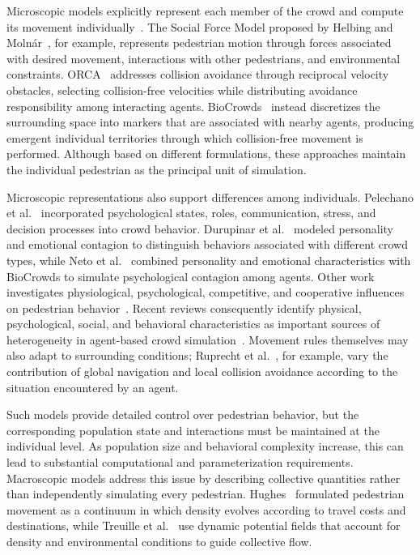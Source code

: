 Microscopic models explicitly represent each member of the crowd and compute its movement individually~\cite{macal2010agentBasedTutorial,thalmann2007crowd}. The Social Force Model proposed by Helbing and Moln\'ar~\cite{helbing1995social}, for example, represents pedestrian motion through forces associated with desired movement, interactions with other pedestrians, and environmental constraints. ORCA~\cite{van2011reciprocal} addresses collision avoidance through reciprocal velocity obstacles, selecting collision-free velocities while distributing avoidance responsibility among interacting agents. BioCrowds~\cite{de2012simulating} instead discretizes the surrounding space into markers that are associated with nearby agents, producing emergent individual territories through which collision-free movement is performed. Although based on different formulations, these approaches maintain the individual pedestrian as the principal unit of simulation.

Microscopic representations also support differences among individuals. Pelechano et al.~\cite{pelechano2005crowd} incorporated psychological states, roles, communication, stress, and decision processes into crowd behavior. Durupinar et al.~\cite{durupinar2015psychological} modeled personality and emotional contagion to distinguish behaviors associated with different crowd types, while Neto et al.~\cite{neto2017giving} combined personality and emotional characteristics with BioCrowds to simulate psychological contagion among agents. Other work investigates physiological, psychological, competitive, and cooperative influences on pedestrian behavior~\cite{narang2015generating,cao2021competitiveCooperative}. Recent reviews consequently identify physical, psychological, social, and behavioral characteristics as important sources of heterogeneity in agent-based crowd simulation~\cite{khan2024heterogeneousSurvey,zhang2023collectiveBehavior}. Movement rules themselves may also adapt to surrounding conditions; Ruprecht et al.~\cite{ruprecht2024adaptiveMovement}, for example, vary the contribution of global navigation and local collision avoidance according to the situation encountered by an agent.

Such models provide detailed control over pedestrian behavior, but the corresponding population state and interactions must be maintained at the individual level. As population size and behavioral complexity increase, this can lead to substantial computational and parameterization requirements. Macroscopic models address this issue by describing collective quantities rather than independently simulating every pedestrian. Hughes~\cite{hughes2002continuum} formulated pedestrian movement as a continuum in which density evolves according to travel costs and destinations, while Treuille et al.~\cite{treuille2006continuum} use dynamic potential fields that account for density and environmental conditions to guide collective flow.

